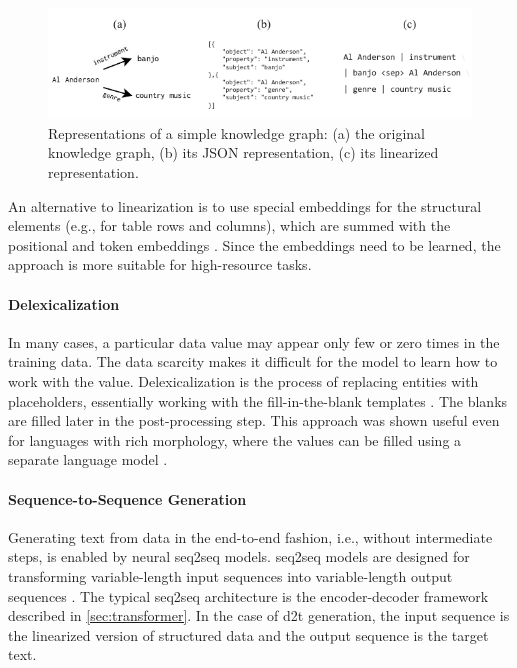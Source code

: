 {\begin{figure}[h]
    \centering
    \includegraphics[width=\textwidth]{img/linearization.pdf}

    \caption{Representations of a simple knowledge graph: (a) the original knowledge graph, (b) its JSON representation, (c) its linearized representation.}\label{fig:linearization}

\end{figure}

An alternative to linearization is to use special embeddings for the structural elements (e.g., for table rows and columns), which are summed with the positional and token embeddings \cite{wang2021tuta,yangTableFormerRobustTransformer2022}. Since the embeddings need to be learned, the approach is more suitable for high-resource tasks.

\paragraph{Delexicalization} In many cases, a particular data value may appear only few or zero times in the training data. The data scarcity makes it difficult for the model to learn how to work with the value. Delexicalization is the process of replacing entities with placeholders, essentially working with the fill-in-the-blank templates \cite{oh2000stochastic,mairesse2010phrase,wen2015semantically,dusekSequencetoSequenceGenerationSpoken2016}.  The blanks are filled later in the post-processing step. This approach was shown useful even for languages with rich morphology, where the values can be filled using a separate language model \cite{duvsek2019neural}.

\paragraph{Sequence-to-Sequence Generation} Generating text from data in the end-to-end fashion, i.e., without intermediate steps, is enabled by neural \ac{seq2seq} models. \Ac{seq2seq} models are designed for transforming variable-length input sequences into variable-length output sequences \cite{cho2014learning,sutskever2014sequence}. The typical \ac{seq2seq} architecture is the encoder-decoder framework described in \autoref{sec:transformer}. In the case of \ac{d2t} generation, the input sequence is the linearized version of structured data and the output sequence is the target text.

}
